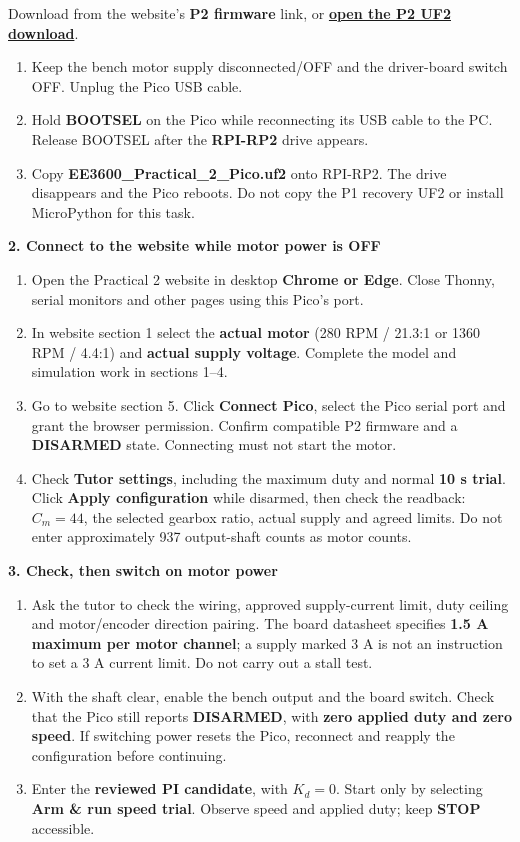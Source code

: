 \documentclass[11pt,a4paper]{article}
\newcommand{\sub}[1]{\vspace{4pt}\textbf{#1}\par}
\newcommand{\ui}[1]{\textbf{#1}}
\begin{document}
Download from the website's \ui{P2 firmware} link, or \href{https://ericwangjcu.github.io/EE3600-Motor-Practicals/firmware/EE3600_Practical_2_Pico.uf2}{\textbf{open the P2 UF2 download}}.
\begin{enumerate}
\item Keep the bench motor supply disconnected/OFF and the driver-board switch OFF. Unplug the Pico USB cable.
\item Hold \textbf{BOOTSEL} on the Pico while reconnecting its USB cable to the PC. Release BOOTSEL after the \textbf{RPI-RP2} drive appears.
\item Copy \textbf{EE3600\_Practical\_2\_Pico.uf2} onto RPI-RP2. The drive disappears and the Pico reboots. Do not copy the P1 recovery UF2 or install MicroPython for this task.
\end{enumerate}
\sub{2. Connect to the website while motor power is OFF}
\begin{enumerate}
\item Open the Practical 2 website in desktop \textbf{Chrome or Edge}. Close Thonny, serial monitors and other pages using this Pico's port.
\item In website section 1 select the \textbf{actual motor} (280 RPM / 21.3:1 or 1360 RPM / 4.4:1) and \textbf{actual supply voltage}. Complete the model and simulation work in sections 1--4.
\item Go to website section 5. Click \ui{Connect Pico}, select the Pico serial port and grant the browser permission. Confirm compatible P2 firmware and a \textbf{DISARMED} state. Connecting must not start the motor.
\item Check \ui{Tutor settings}, including the maximum duty and normal \textbf{10 s trial}. Click \ui{Apply configuration} while disarmed, then check the readback: $C_m=44$, the selected gearbox ratio, actual supply and agreed limits. Do not enter approximately 937 output-shaft counts as motor counts.
\end{enumerate}
\sub{3. Check, then switch on motor power}
\begin{enumerate}
\item Ask the tutor to check the wiring, approved supply-current limit, duty ceiling and motor/encoder direction pairing. The board datasheet specifies \textbf{1.5 A maximum per motor channel}; a supply marked 3 A is not an instruction to set a 3 A current limit. Do not carry out a stall test.
\item With the shaft clear, enable the bench output and the board switch. Check that the Pico still reports \textbf{DISARMED}, with \textbf{zero applied duty and zero speed}. If switching power resets the Pico, reconnect and reapply the configuration before continuing.
\item Enter the \textbf{reviewed PI candidate}, with $K_d=0$. Start only by selecting \ui{Arm \& run speed trial}. Observe speed and applied duty; keep \ui{STOP} accessible.
\end{enumerate}
\end{document}
